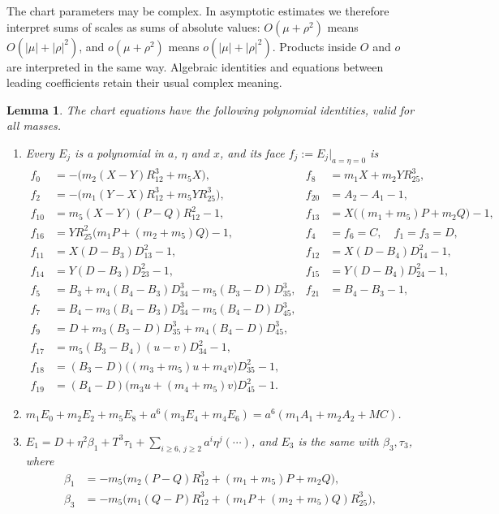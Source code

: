 \documentclass[11pt]{amsart}
\newenvironment{romanlist}{\begin{enumerate}\renewcommand{\labelenumi}{(\roman{enumi})}%
  \renewcommand{\theenumi}{\roman{enumi}}}{\end{enumerate}}
\newtheorem{lemma}[theorem]{Lemma}
\theoremstyle{definition}
\theoremstyle{remark}
\begin{document}
{The chart parameters may be complex.  In asymptotic estimates we therefore
interpret sums of scales as sums of absolute values: $O(\mu+\rho^2)$ means
$O(|\mu|+|\rho|^2)$, and $o(\mu+\rho^2)$ means $o(|\mu|+|\rho|^2)$.
Products inside $O$ and $o$ are interpreted in the same way.  Algebraic identities and
equations between leading coefficients retain their usual complex meaning.}

{\begin{lemma}\label{lem:d8-rows}
The chart equations have the following polynomial identities, valid for all masses.
\begin{romanlist}
\item Every $E_j$ is a polynomial in $a$, $\eta$ and $x$, and its \emph{face}
$f_j:=E_j|_{a=\eta=0}$ is
\begin{align*}
  f_0&=-\bigl(m_2(X-Y)R_{12}^3+m_5X\bigr), & f_8&=m_1X+m_2YR_{25}^3,\\
  f_2&=-\bigl(m_1(Y-X)R_{12}^3+m_5YR_{25}^3\bigr), & f_{20}&=A_2-A_1-1,\\
  f_{10}&=m_5(X-Y)(P-Q)R_{12}^2-1, & f_{13}&=X\bigl((m_1+m_5)P+m_2Q\bigr)-1,\\
  f_{16}&=YR_{25}^2\bigl(m_1P+(m_2+m_5)Q\bigr)-1, & f_4&=f_6=C,\quad f_1=f_3=D,\\
  f_{11}&=X(D-B_3)D_{13}^2-1, & f_{12}&=X(D-B_4)D_{14}^2-1,\\
  f_{14}&=Y(D-B_3)D_{23}^2-1, & f_{15}&=Y(D-B_4)D_{24}^2-1,\\
  f_5&=B_3+m_4(B_4-B_3)D_{34}^3-m_5(B_3-D)D_{35}^3, & f_{21}&=B_4-B_3-1,\\
  f_7&=B_4-m_3(B_4-B_3)D_{34}^3-m_5(B_4-D)D_{45}^3,\\
  f_9&=D+m_3(B_3-D)D_{35}^3+m_4(B_4-D)D_{45}^3,\\
  f_{17}&=m_5(B_3-B_4)(u-v)D_{34}^2-1,\\
  f_{18}&=(B_3-D)\bigl((m_3+m_5)u+m_4v\bigr)D_{35}^2-1,\\
  f_{19}&=(B_4-D)\bigl(m_3u+(m_4+m_5)v\bigr)D_{45}^2-1.
\end{align*}
\item $m_1E_0+m_2E_2+m_5E_8+a^6(m_3E_4+m_4E_6)=a^6(m_1A_1+m_2A_2+MC)$.
\item $E_1=D+\eta^2\beta_1+T^3\tau_1+\sum_{i\ge6,\,j\ge2}a^i\eta^j(\cdots)$, and $E_3$ is the
same with $\beta_3,\tau_3$, where
\begin{align*}
  \beta_1&=-m_5\bigl(m_2(P-Q)R_{12}^3+(m_1+m_5)P+m_2Q\bigr),\\
  \beta_3&=-m_5\bigl(m_1(Q-P)R_{12}^3+(m_1P+(m_2+m_5)Q)R_{25}^3\bigr),\\

\end{align*}
\end{romanlist}
\end{lemma}}
\end{document}
